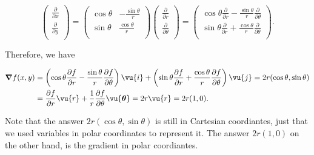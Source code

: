 \documentclass[english,a4paper,12pt]{report}
\begin{document}
{\begin{equation}
	\begin{pmatrix}
		 \frac{\partial }{\partial x}  \\
		 \frac{\partial }{\partial y}  \\
	\end{pmatrix} = \begin{pmatrix}
		\cos \theta  & -\frac{\sin \theta }{r}   \\
		\sin \theta  & \frac{\cos \theta }{r}   \\
	\end{pmatrix} \begin{pmatrix}
		 \frac{\partial }{\partial r}  \\
		 \frac{\partial }{\partial \theta }  \\
	\end{pmatrix} = \begin{pmatrix}
		 \cos \theta \frac{\partial }{\partial r} - \frac{\sin \theta }{r}\frac{\partial }{\partial \theta }   \\
		 \sin \theta \frac{\partial }{\partial r} + \frac{\cos \theta }{r}\frac{\partial }{\partial \theta }   \\
	\end{pmatrix}.
\end{equation}


Therefore, we have 

\begin{equation}
	\begin{aligned} 
	\boldsymbol{\nabla }f(x,y)  &= \left( \cos \theta \frac{\partial f}{\partial r} - \frac{\sin \theta}{r} \frac{\partial f}{\partial \theta }   \right) \vu{i} + \left( \sin \theta \frac{\partial f}{\partial r} + \frac{\cos \theta }{r} \frac{\partial f}{\partial \theta } \right)\vu{j} = 2r(\cos \theta , \sin \theta ) \\ 
	&= \frac{\partial f}{\partial r} \vu{r} + \frac{1}{r} \frac{\partial f}{\partial \theta }\vu{\boldsymbol{\theta } } = 2r \vu{r} = 2r(1,0).  
	\end{aligned}   
\end{equation}

Note that the answer \(2r(\cos \theta ,\sin \theta )\) is still in Cartesian coordiantes, just that we used variables in polar coordinates to represent it. The answer \(2r(1,0)\) on the other hand, is the gradient in polar coordiantes.   



} 
\end{document}
